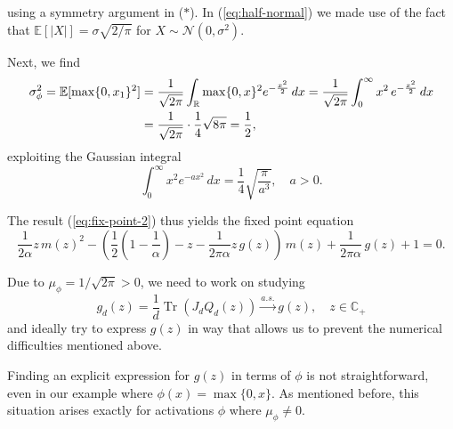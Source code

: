 \documentclass{article}
\begin{document}
using a symmetry argument in ($*$). In (\ref{eq:half-normal}) we made use of the fact that $\mathbb{E}[|X|]=\sigma\sqrt{2/\pi}$ for $X\sim\mathcal{N}(0,\sigma^2)$.
\par
Next, we find
\begin{align}
\sigma_\phi^2=\mathbb{E}[\max\{0,x_1\}^2] &= \frac{1}{\sqrt{2\pi}}\int_{\mathbb{R}}\max\{0,x\}^2e^{-\frac{x^2}{2}}\,dx
= \frac{1}{\sqrt{2\pi}}\int_0^\infty x^2\,e^{-\frac{x^2}{2}}\,dx \notag
\\ &= \frac{1}{\sqrt{2\pi}}\cdot\frac{1}{4}\sqrt{8\pi} = \frac{1}{2},\label{eq:parameter2}
\end{align}
exploiting the Gaussian integral
\begin{equation}
\int_0^\infty x^2 e^{-ax^2}\,dx=\frac{1}{4}\sqrt{\frac{\pi}{a^3}},\quad a>0.
\end{equation}
\par
The result (\ref{eq:fix-point-2}) thus yields the fixed point equation
\begin{equation}
\frac{1}{2\alpha}z\,m(z)^2-\left(\frac{1}{2}\left(1-\frac{1}{\alpha}\right)-z-\frac{1}{2\pi\alpha}z\,g(z)\right)\,m(z)+\frac{1}{2\pi\alpha}\,g(z)+1=0.
\end{equation}
\par
Due to $\mu_\phi=1/\sqrt{2\pi}>0$, we need to work on studying
$$g_d(z)=\frac{1}{d}\operatorname{Tr}(J_{d}Q_{d}(z))\stackrel{a.s.}{\to}g(z),\quad z\in\mathbb{C}_+$$
and ideally try to express $g(z)$ in way that allows us to prevent the numerical difficulties mentioned above.
\bigskip
\par
Finding an explicit expression for $g(z)$ in terms of $\phi$ is not straightforward, even in our example where $\phi(x)=\max\{0,x\}$. As mentioned before, this situation arises exactly for activations $\phi$ where $\mu_\phi\neq0$.
\bigskip
\end{document}
